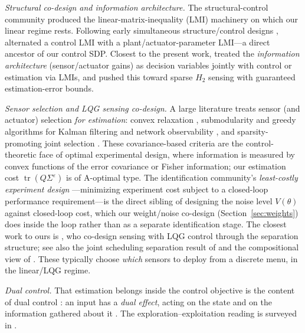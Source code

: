 \documentclass[twocolumn,amsthm]{autart}
\begin{document}
\emph{Structural co-design and information architecture.}
The structural-control community produced the linear-matrix-inequality (LMI)
machinery on which our linear regime rests. Following early
simultaneous structure/control designs \cite{onoda1987approach,hale1985optimal},
\cite{grigoriadis1998integrate} alternated a control LMI with a
plant/actuator-parameter LMI---a direct ancestor of our control SDP. Closest to
the present work, \cite{li2008integrating} treated the \emph{information
architecture} (sensor/actuator gains) as decision variables jointly with control
or estimation via LMIs, and \cite{saraf2017h2,das2017sparse} pushed this toward
sparse $H_2$ sensing with guaranteed estimation-error bounds.

\emph{Sensor selection and LQG sensing co-design.}
A large literature treats sensor (and actuator) selection \emph{for estimation}:
convex relaxation \cite{joshi2009sensor}, submodularity and greedy algorithms for
Kalman filtering and network observability
\cite{tzoumas2016sensor,zhang2017sensor}, and
sparsity-promoting joint selection \cite{dhingra2014admm}. These
covariance-based criteria are the control-theoretic face of optimal experimental
design, where information is measured by convex functions of the error covariance
or Fisher information; our estimation cost
$\operatorname{tr}(Q\Sigma^\varepsilon)$ is of A-optimal type. The identification
community's \emph{least-costly experiment design}
\cite{gevers2005identification}---minimizing experiment cost
subject to a closed-loop performance requirement---is the direct sibling of
designing the noise level $V(\theta)$ against closed-loop cost, which our
weight/noise co-design (Section~\ref{sec:weights}) does inside the loop rather than
as a separate identification stage. The closest work to ours
is \cite{tzoumas2021lqg}, who co-design sensing with LQG control through the
separation structure; see also the joint scheduling separation result of
\cite{siami2021separation} and the compositional view of \cite{zardini2021codesign}.
These typically choose \emph{which} sensors to deploy from a discrete menu, in
the linear/LQG regime.

\emph{Dual control.}
That estimation belongs inside the control objective is the content of dual
control \cite{feldbaum1960dual}: an input has a \emph{dual effect}, acting on the
state and on the information gathered about it \cite{bar1974dual}. The
exploration--exploitation reading is surveyed in \cite{mesbah2018stochastic}.
\end{document}
